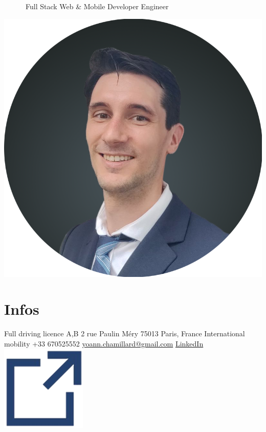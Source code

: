 \documentclass[]{friggeri-cv}
\begin{document}
      {~~~~~~Full Stack Web \& Mobile Developer Engineer}
      {}

\begin{aside}
\hspace{10mm}\includegraphics[scale=0.148]{res/img/Photo_CV.png}\section{Infos}
Full driving licence A,B\vspace{2.5mm}
2 rue Paulin Méry
75013 Paris,
France\vspace{1.5mm}
International mobility\vspace{2.5mm}
+33 670525552
\href{mailto:yoann.chamillard@gmail.com}{\small yoann.chamillard@gmail.com}\vspace{2.5mm}
\href{http://fr.linkedin.com/in/yoannchamillard}{LinkedIn\hspace{1.5mm}\includegraphics[scale=0.075]{res/img/hlink.png}}

\end{aside}
\end{document}
